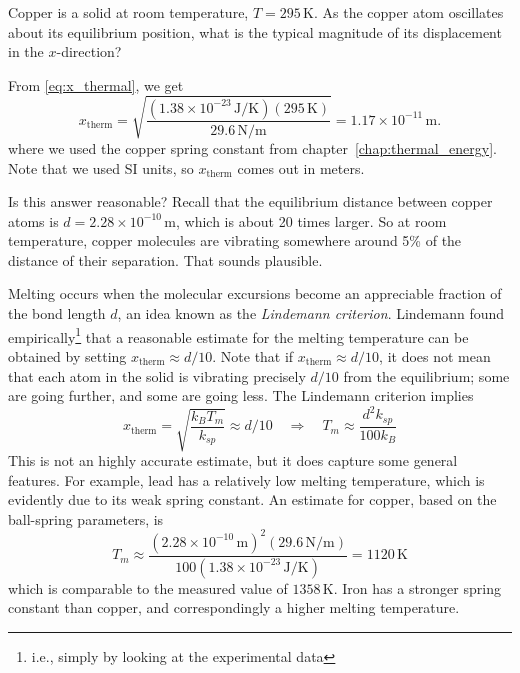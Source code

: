 \begin{example}
  Copper is a solid at room temperature, $T=295\,\text{K}$.  As the
  copper atom oscillates about its equilibrium position, what is the
  typical magnitude of its displacement in the $x$-direction?
  

\solution From \eqref{eq:x_thermal}, we get
\begin{equation}
x_\text{therm} = \sqrt{\frac{(1.38\times 10^{-23}\,\text{J/K})(295\,\text{K})}
{29.6\,\text{N/m}}} =  1.17\times 10^{-11}\,\text{m}.
\end{equation}
where we used the copper spring constant from
chapter~\ref{chap:thermal_energy}.  Note that we used SI
units, so $x_\text{therm}$ comes out in meters.  

Is this answer reasonable?  Recall that the equilibrium distance
between copper atoms is $d=2.28\times 10^{-10}\,\text{m}$, which is
about 20 times larger.  So at room temperature, copper molecules are
vibrating somewhere around 5\% of the distance of their separation.
That sounds plausible.  \end{example}

Melting occurs when the molecular excursions become an appreciable
fraction of the bond length $d$, an idea known as the \textit{  Lindemann criterion}.  Lindemann found empirically\footnote{i.e.,
simply by looking at the experimental data} that a reasonable estimate
for the melting temperature can be obtained by setting $x_\text{therm}
\approx d/10$.  Note that if $x_\text{therm} \approx d/10$, it does
not mean that each atom in the solid is vibrating precisely $d/10$
from the equilibrium; some are going further, and some are going less.
The Lindemann criterion implies
\begin{equation}
x_\text{therm} = \sqrt{\frac{k_BT_m}{k_{sp}}} \approx d/10 \quad\Rightarrow\quad
T_m \approx \frac{d^2k_{sp}}{100 k_B}
\end{equation}
This is not an highly accurate estimate, but it does capture some
general features.  For example, lead has a relatively low melting
temperature, which is evidently due to its weak spring constant.
An estimate for copper, based on the ball-spring parameters, is
\begin{equation}
T_{m} \approx \frac{(2.28\times 10^{-10}\,\text{m})^2(29.6\,\text{N/m})}
{100(1.38\times 10^{-23}\,\text{J/K})} = 1120\,\text{K}
\end{equation}
which is comparable to the measured value of $1358\,\text{K}$.  Iron
has a stronger spring constant than copper, and correspondingly a 
higher melting temperature.

